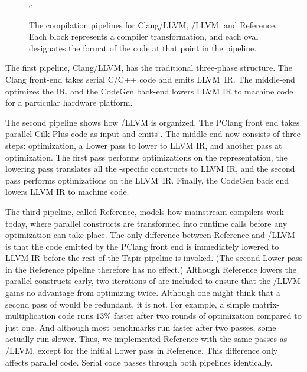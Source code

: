 \begin{figure}[t]

\begin{tab}{c}
\bottomrule
\end{tab}
\caption[The compilation pipelines for Clang/LLVM, \tapir/LLVM, and
  Reference.]{The compilation pipelines for Clang/LLVM, \tapir/LLVM, and
  Reference.  Each block represents a compiler transformation, and
  each oval designates the format of the code at that point in the
  pipeline.}
  \label{fig:pipeline}
\end{figure}


The first pipeline, Clang/LLVM, has the traditional three-phase
structure.  The Clang front-end takes serial C/C++ code and emits
LLVM~IR\@.  The  middle-end optimizes the IR, and the
CodeGen back-end lowers LLVM IR to machine code for a particular
hardware platform.

The second pipeline shows how \tapir/LLVM is organized.  The PClang
front end takes parallel Cilk Plus code as input and emits
\tapir.  The middle-end now consists of three steps: 
optimization, a Lower pass to lower \tapir to LLVM IR, and another
pass at  optimization.  The first  pass performs
optimizations on the \tapir representation, the lowering pass
translates all the \tapir-specific constructs to LLVM IR, and the
second  pass performs optimizations on the LLVM~IR\@.
Finally, the CodeGen back end lowers LLVM IR to machine code.

The third pipeline, called Reference, models how mainstream compilers
work today, where parallel constructs are transformed into runtime
calls before any optimization can take place.  The only difference
between Reference and \tapir/LLVM is that the \tapir code emitted by
the PClang front end is immediately lowered to LLVM IR before the rest
of the Tapir pipeline is invoked.  (The second Lower pass in the
Reference pipeline therefore has no effect.)  Although Reference
lowers the parallel constructs early, two iterations of  are
included to ensure that the \tapir/LLVM gains no advantage from
optimizing twice.  Although one might think that a second pass of
 would be redundant, it is not.  For example, a simple
matrix-multiplication code runs $13\%$ faster after two rounds of
optimization compared to just one.  And although most benchmarks run
faster after two  passes, some actually run slower.  Thus,
we implemented Reference with the same passes as \tapir/LLVM, except
for the initial Lower pass in Reference.  This difference only affects
parallel code.  Serial code passes through both pipelines identically.

